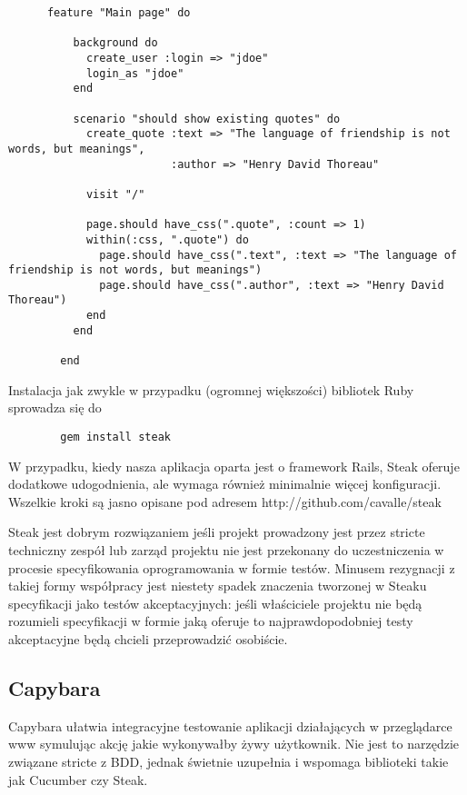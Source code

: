       \begin{verbatim}
      feature "Main page" do

          background do
            create_user :login => "jdoe"
            login_as "jdoe"
          end

          scenario "should show existing quotes" do
            create_quote :text => "The language of friendship is not words, but meanings",
                         :author => "Henry David Thoreau"

            visit "/"

            page.should have_css(".quote", :count => 1)
            within(:css, ".quote") do
              page.should have_css(".text", :text => "The language of friendship is not words, but meanings")
              page.should have_css(".author", :text => "Henry David Thoreau")
            end
          end

        end
      \end{verbatim}
      
      Instalacja jak zwykle w przypadku (ogromnej większości) bibliotek Ruby sprowadza się do
      
      \begin{verbatim}
        gem install steak
      \end{verbatim}
      
      W przypadku, kiedy nasza aplikacja oparta jest o framework Rails, Steak oferuje dodatkowe udogodnienia, ale wymaga również minimalnie więcej konfiguracji. Wszelkie kroki są jasno opisane pod adresem http://github.com/cavalle/steak
      
      Steak jest dobrym rozwiązaniem jeśli projekt prowadzony jest przez stricte techniczny zespół lub zarząd projektu nie jest przekonany do uczestniczenia w procesie specyfikowania oprogramowania w formie testów. Minusem rezygnacji z takiej formy współpracy jest niestety spadek znaczenia tworzonej w Steaku specyfikacji jako testów akceptacyjnych: jeśli właściciele projektu nie będą rozumieli specyfikacji w formie jaką oferuje to najprawdopodobniej testy akceptacyjne będą chcieli przeprowadzić osobiście.
    
    \subsection{Capybara}  

      Capybara ułatwia integracyjne testowanie aplikacji działających w przeglądarce www symulując akcję jakie wykonywałby żywy użytkownik. Nie jest to narzędzie związane stricte z BDD, jednak świetnie uzupełnia i wspomaga biblioteki takie jak Cucumber czy Steak.
      
